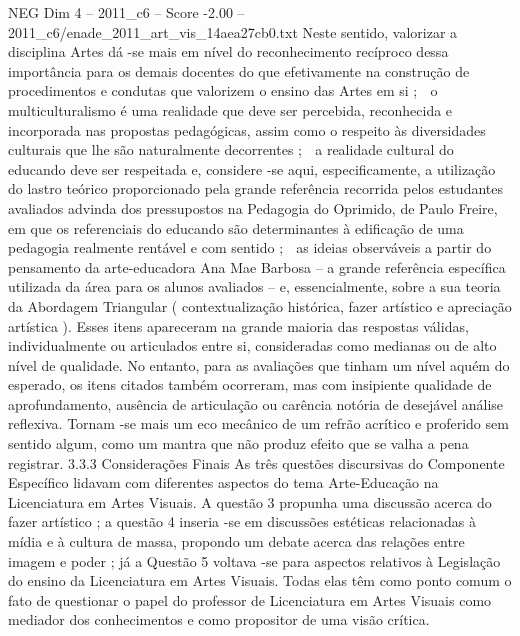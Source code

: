 \begin{textsample}{NEG Dim 4 – 2011\_c6 – Score -2.00 – 2011\_c6/enade\_2011\_art\_vis\_14aea27cb0.txt}
Neste sentido, valorizar a disciplina Artes dá -se mais em nível do reconhecimento recíproco dessa importância para os demais docentes do que efetivamente na construção de procedimentos e condutas que valorizem o ensino das Artes em si ;  o multiculturalismo é uma realidade que deve ser percebida, reconhecida e incorporada nas propostas pedagógicas, assim como o respeito às diversidades culturais que lhe são naturalmente decorrentes ;  a realidade cultural do educando deve ser respeitada e, considere -se aqui, especificamente, a utilização do lastro teórico proporcionado pela grande referência recorrida pelos estudantes avaliados advinda dos pressupostos na Pedagogia do Oprimido, de Paulo Freire, em que os referenciais do educando são determinantes à edificação de uma pedagogia realmente rentável e com sentido ;  as ideias observáveis a partir do pensamento da arte-educadora Ana Mae Barbosa – a grande referência específica utilizada da área para os alunos avaliados – e, essencialmente, sobre a sua teoria da Abordagem Triangular ( contextualização histórica, fazer artístico e apreciação artística ).
Esses itens apareceram na grande maioria das respostas válidas, individualmente ou articulados entre si, consideradas como medianas ou de alto nível de qualidade.
No entanto, para as avaliações que tinham um nível aquém do esperado, os itens citados também ocorreram, mas com insipiente qualidade de aprofundamento, ausência de articulação ou carência notória de desejável análise reflexiva.
Tornam -se mais um eco mecânico de um refrão acrítico e proferido sem sentido algum, como um mantra que não produz efeito que se valha a pena registrar. 3.3.3 Considerações Finais As três questões discursivas do Componente Específico lidavam com diferentes aspectos do tema Arte-Educação na Licenciatura em Artes Visuais.
A questão 3 propunha uma discussão acerca do fazer artístico ; a questão 4 inseria -se em discussões estéticas relacionadas à mídia e à cultura de massa, propondo um debate acerca das relações entre imagem e poder ; já a Questão 5 voltava -se para aspectos relativos à Legislação do ensino da Licenciatura em Artes Visuais.
Todas elas têm como ponto comum o fato de questionar o papel do professor de Licenciatura em Artes Visuais como mediador dos conhecimentos e como propositor de uma visão crítica.

\end{textsample}
